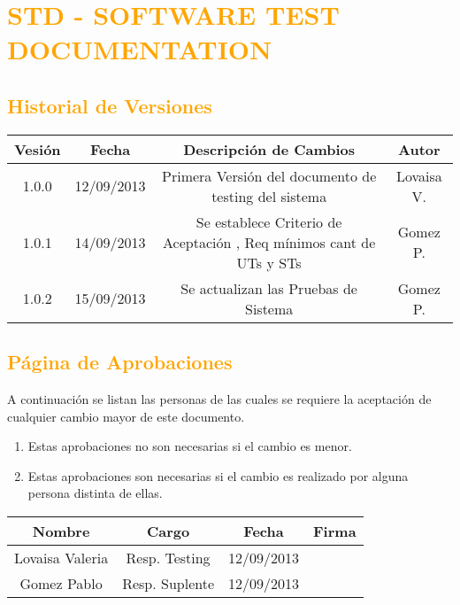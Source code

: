 \chapter{\textcolor{orange}{STD - SOFTWARE TEST DOCUMENTATION}}
\newpage
\section{\textcolor{orange}{Historial de Versiones}}
\begin{table}[!h]
\begin{center}
\begin{tabular}{|c|c|c|c|}
\hline
\rowcolor[RGB]{255,127,0} Vesión & Fecha & Descripción de Cambios & Autor\\
\hline
1.0.0 & 12/09/2013 & Primera Versión del documento de testing del sistema & Lovaisa V.\\
\hline
1.0.1 & 14/09/2013 & Se establece Criterio de Aceptación , Req mínimos cant de UTs y STs & Gomez P.\\
\hline
1.0.2 & 15/09/2013 & Se actualizan las Pruebas de Sistema & Gomez P.\\
\hline
\end{tabular}
\end{center}
\end{table}
\newpage

\section{\textcolor{orange}{Página de Aprobaciones}}
A continuación se listan las personas de las cuales se requiere la aceptación de cualquier cambio mayor de este documento.
\begin{enumerate}
  \item Estas aprobaciones no son necesarias si el cambio es menor.
  \item Estas aprobaciones son necesarias si el cambio es realizado por alguna
  persona distinta de ellas.
\end{enumerate}
\begin{table}[!h]
\begin{center}
\begin{tabular}{|c|c|c|c|}
\hline
\rowcolor[RGB]{255,127,0} Nombre & Cargo & Fecha & Firma\\
\hline
Lovaisa Valeria & Resp. Testing & 12/09/2013 & \\
\hline
Gomez Pablo & Resp. Suplente & 12/09/2013 & \\
\hline
\end{tabular}
\end{center}
\end{table}

